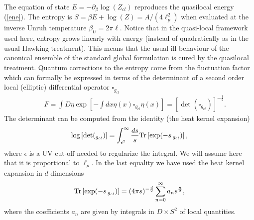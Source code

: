 \documentclass[aps, nofootinbib,superscriptaddress,12pt]{revtex4-2}
\def\be{\begin{equation}}
\def\ee{\end{equation}}
\def\ba{\begin{eqnarray}}
\def\ea{\end{eqnarray}}
\newcommand{\mfs}[1]{\mathfs {#1}}                               %
\newcommand{\sL}{{\mfs L}}
\begin{document}
The equation of state $E=-\partial_{\beta} \log(Z_{cl})$ reproduces the quasilocal energy (\ref{ene}).
The entropy is $S=\beta E+\log(Z)=A/(4\ell_p^2)$ when evaluated at the inverse Unruh temperature $\beta_U=2\pi\ell$.
Notice that in the quasi-local framework used here, entropy grows linearly with energy (instead of quadratically as in the usual Hawking treatment). This means that the usual ill behaviour of the canonical ensemble of the standard 
global formulation \cite{Hawking:1976de} is cured by the quasilocal treatment. Quantum corrections to the entropy come from the fluctuation factor 
which can formally be expressed  in terms of the determinant of a second order local (elliptic) differential operator $\square_{g_{cl}}$ 
\ba
&& F%
=\int D\eta \exp\left[-\int dx \eta(x) \square_{g_{cl}} \eta(x)\right]=\left[{\det(\square_{g_{cl}})}\right]^{-\frac{1}{2}}.
\ea
The determinant can be computed from the identity (the heat kernel expansion)
\be
\log\left[{\det(\square_{g_{cl}})}\right]
=\int_{{\epsilon}^2}^{\infty} \frac{ds}{s} {\rm Tr}\left[\exp(-s \,\square_{g_{cl}})\right],
\ee
where $\epsilon$ is a UV cut-off needed to regularize the integral. We will assume here that it is proportional to $\ell_p$.
In the last equality we have used the heat kernel expansion in $d$ dimensions \be{\rm Tr}\left[\exp(-s\, \square_{g_{cl}})\right]=(4\pi s)^{-\frac{d}{2}} \sum_{n=0}^{\infty} a_n s^{\frac{n}{2}}, \ee where the coefficients $a_n$ are given by integrals in $D\times S^2$ of local quantities.  

\end{document}
